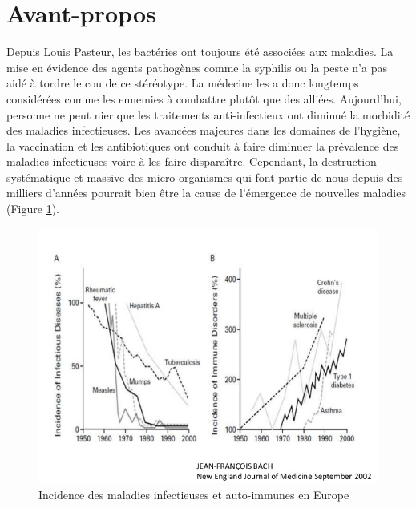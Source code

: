 \documentclass[12pt,a4paper]{article}
\begin{document}
 \newpage
\section{Avant-propos}

Depuis Louis Pasteur, les bactéries ont toujours été associées aux maladies. La mise en évidence des agents pathogènes comme la syphilis ou la peste n'a pas aidé à tordre le cou de ce stéréotype. La médecine les a donc longtemps considérées comme les ennemies à combattre plutôt que des alliées.
Aujourd'hui, personne ne peut nier que les traitements anti-infectieux ont diminué la morbidité des maladies infectieuses.
Les avancées majeures dans les domaines de l'hygiène, la vaccination et les antibiotiques ont conduit à faire diminuer la prévalence des maladies infectieuses voire à les faire disparaître. Cependant, la destruction systématique et massive des micro-organismes qui font partie de nous depuis des milliers d'années pourrait bien être la cause de l'émergence de nouvelles maladies\cite{Bach2002} (Figure \ref{hyigienisme}).


\begin{figure}[ht]
\begin{center}
\includegraphics[scale=0.5]{img/allergie_infection.jpg}\hfill
\end{center}
\caption{Incidence des maladies infectieuses et auto-immunes en Europe }
\label{hyigienisme}
\end{figure}
\end{document}
